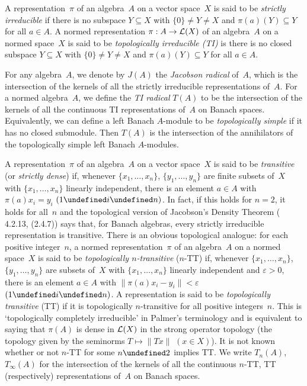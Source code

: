 \documentclass[11pt]{article}
\newcommand{\sseq}{\subseteq}
\let\leq\undefined  \let\geq\undefined
\let\le\leq   \let\ge\geq
\newcommand{\e}{\varepsilon}
\newcommand{\LX}{{\cal L}(X)}
\begin{document}
A representation~$\pi$ of an algebra~$A$ on a vector space~$X$ is said to be
{\em strictly irreducible} if there is no subspace $Y \sseq X$ with $\{0\} \ne Y \ne X$
and $\pi(a)(Y) \sseq Y$ for all $a \in A$.  A normed representation $\pi:A \to
\LX$ of an algebra~$A$ on a normed space~$X$ is said to be {\em topologically
irreducible (TI)} is there is no closed subspace $Y \sseq X$ with $\{0\} \ne Y
\ne X$ and $\pi(a)(Y) \sseq Y$ for all $a \in A$.

For any algebra~$A$, we denote by $J(A)$ the {\em Jacobson radical} of~$A$,
which is the intersection of the kernels of all the strictly irreducible
representations of~$A$.
For a normed algebra~$A$, we define the {\em TI radical} $T(A)$ to be the
intersection of the kernels of all the continuous TI representations of~$A$ on
Banach spaces.
Equivalently, we can define a left Banach $A$-module to be {\em topologically
simple} if it has no closed submodule.    Then $T(A)$ is the intersection of the
annihilators of the topologically simple left Banach $A$-modules.

A representation~$\pi$ of an algebra~$A$ on a vector space~$X$ is said to be
{\em transitive} (or {\em strictly dense}) if, whenever $\{x_1,\dots,x_n\}$,
$\{y_1,\dots,y_n\}$ are finite subsets of~$X$ with $\{x_1,\dots,x_n\}$ linearly
independent, there is an element $a \in A$ with $\pi(a)x_i = y_i$ $(1 \le i \le
n)$.  In fact, if this holds for $n=2$, it holds for all~$n$ and the topological
version of Jacobson's Density Theorem (\cite{Palmerbk} 4.2.13, \cite{Rickart}
(2.4.7)) says that, for Banach algebras, every strictly irreducible representation is
transitive.  There is an obvious topological analogue:  for each positive
integer~$n$, a normed representation~$\pi$ of an algebra~$A$ on a normed
space~$X$ is said to be {\em topologically $n$-transitive} ($n$-TT) if, whenever
$\{x_1,\dots,x_n\}$, $\{y_1,\dots,y_n\}$ are subsets of~$X$ with
$\{x_1,\dots,x_n\}$ linearly independent and $\e > 0$, there is an element $a
\in A$ with $\|\pi(a)x_i - y_i\| < \e$ $(1 \le i \le n)$.   A representation is
said to be {\em topologically transitive} (TT)  if it is topologically
$n$-transitive for all positive integers~$n$.   This is `topologically
completely irreducible' in Palmer's terminology and is equivalent to saying that
$\pi(A)$ is dense in $\LX$ in the strong operator topology (the topology given
by the seminorms $T \mapsto \|Tx\|$ $(x \in X)$).    It is not known whether or
not $n$-TT for some $n \ge 2$ implies TT.  We write $T_n(A)$, $T_\infty(A)$ for the
intersection of the kernels of all the continuous $n$-TT, TT (respectively)
representations of~$A$ on Banach spaces.
\end{document}
